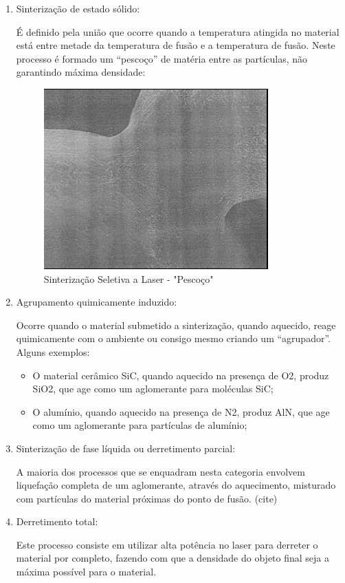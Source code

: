 \documentclass[12pt, english]{article}
\begin{document}
\begin{enumerate}[leftmargin=*, listparindent=0.7cm]
	\item {
		Sinterização de estado sólido:

		É definido pela união que ocorre quando a temperatura atingida no material está entre metade da temperatura de fusão e a temperatura de fusão. Neste processo é formado um “pescoço” de matéria entre as partículas, não garantindo máxima densidade:

		\begin{figure}[H]
			\centering
			\includegraphics[scale=0.8]{SLS-neck.png}
			\caption{Sinterização Seletiva a Laser - "Pescoço"}
		\end{figure}

	}
	\item {
		Agrupamento quimicamente induzido:

		Ocorre quando o material submetido a sinterização, quando aquecido, reage quimicamente com o ambiente ou consigo mesmo criando um “agrupador”. Alguns exemplos:

		\begin{itemize}
		\item O material cerâmico SiC, quando aquecido na presença de O2, produz SiO2, que age como um aglomerante para moléculas SiC;
		\item O alumínio, quando aquecido na presença de N2, produz AlN, que age como um aglomerante para partículas de alumínio;
		\end{itemize}

	}

	\item{
		Sinterização de fase líquida ou derretimento parcial:

		A maioria dos processos que se enquadram nesta categoria envolvem liquefação completa de um aglomerante, através do aquecimento, misturado com partículas do material próximas do ponto de fusão. (cite)

	}
	\item{
	Derretimento total:

	Este processo consiste em utilizar alta potência no laser para derreter o material por completo, fazendo com que a densidade do objeto final seja a máxima possível para o material.
	}
\end{enumerate}
\end{document}

